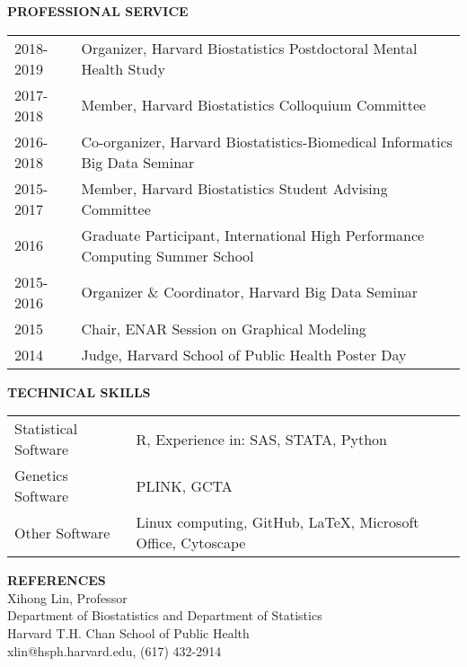 \documentclass[10pt]{article}
\begin{document}
	
{ \bf PROFESSIONAL SERVICE} \hrulefill \\
\setlength\intextsep{0mm}
\begin{center}
	\begin{table}[H]
		\centering
		\begin{tabular}{@{}p{2cm}@{}@{}p{14.9cm}@{}}
			2018-2019  & Organizer, Harvard Biostatistics Postdoctoral Mental Health Study         \\ 
			2017-2018  & Member, Harvard Biostatistics Colloquium Committee          \\ 
			2016-2018  & Co-organizer, Harvard Biostatistics-Biomedical Informatics Big Data Seminar             \\ 
			2015-2017  & Member, Harvard Biostatistics Student Advising Committee    \\ 
			2016  & Graduate Participant, International High Performance Computing Summer School   \\ 
			2015-2016  & Organizer \& Coordinator, Harvard Big Data Seminar    \\ 
			2015  & Chair, ENAR Session on Graphical Modeling  \\ 
			2014  & Judge, Harvard School of Public Health Poster Day 
		\end{tabular}
	\end{table}
\end{center}


{ \bf TECHNICAL SKILLS} \hrulefill \\
\setlength\intextsep{0mm}
\begin{center}
	\begin{table}[H]
		\centering
		\begin{tabular}{@{}p{3.9cm}@{}@{}p{13cm}@{}}
			Statistical Software  &  R, Experience in: SAS, STATA, Python       \\ 
			Genetics Software  & PLINK, GCTA   \\ 
			Other Software  & Linux computing, GitHub, \LaTeX, Microsoft Office, Cytoscape
		\end{tabular}
	\end{table}
\end{center}


{ \bf REFERENCES} \hrulefill \\

\indent \indent Xihong Lin, Professor\\
\indent \indent Department of Biostatistics and Department of Statistics\\
\indent \indent Harvard T.H. Chan School of Public Health\\
\indent \indent xlin@hsph.harvard.edu, (617) 432-2914
\vspace{0.35cm}
\end{document}
